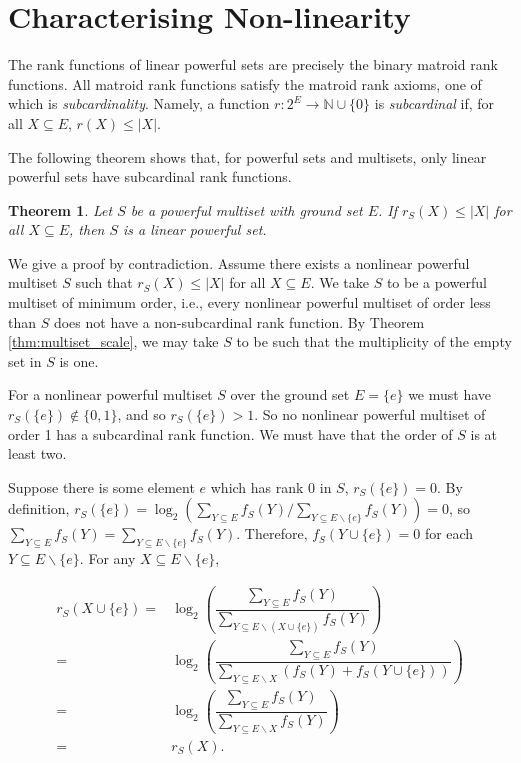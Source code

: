 \documentclass[10pt]{article}
\newtheorem{thm}{Theorem}[section]
\theoremstyle{definition}
\def\pf{\noindent {\it Proof.\ }}
\begin{document}
	
	\section{Characterising Non-linearity} 
	\label{sec:nonlinear}	
	The rank functions of linear powerful sets are precisely the binary matroid rank functions. All matroid rank functions satisfy the matroid rank axioms, one of which is \emph{subcardinality}. Namely, a function $r:2^E\to\mathbb{N}\cup\{0\}$ is \emph{subcardinal} if, for all $X\subseteq E$, $r(X)\leq |X|$. 
	
	The following theorem shows that, for powerful sets and multisets, only linear powerful sets have subcardinal rank functions.
	
	\begin{thm}\label{thm:linear}
		Let $S$ be a powerful multiset with ground set $E$. If $r_S(X)\leq |X|$ for all $X\subseteq E$, then $S$ is a linear powerful set.
	\end{thm}
	
	\pf
		We give a proof by contradiction. Assume there exists a nonlinear powerful multiset $S$ such that $r_S(X)\leq |X|$ for all $X\subseteq E$.  We take $S$ to be a powerful multiset of minimum order, i.e., every nonlinear powerful multiset of order less than $S$ does not have a non-subcardinal rank function.
		By Theorem \ref{thm:multiset_scale}, we may take $S$ to be such that the multiplicity of the empty set in $S$ is one.
	
	For a nonlinear powerful multiset $S$ over the ground set $E=\{e\}$ we must have $r_S(\{e\})\notin \{0,1\}$, and so $r_S(\{e\})> 1$. So no nonlinear powerful multiset of order 1 has a subcardinal rank function. We must have that the order of $S$ is at least two. 
		

	
	Suppose there is some element $e$ which has rank 0 in $S$, $r_S(\{e\})=0$. 	By definition, $r_S(\{e\})=\log_2(\sum_{Y\subseteq E}f_S(Y)/\sum_{Y\subseteq E\backslash\{e\}}f_S(Y))=0$, so $\sum_{Y\subseteq E}f_S(Y)=\sum_{Y\subseteq E\backslash\{e\}}f_S(Y)$. Therefore, $f_S(Y\cup\{e\})=0$ for each $Y\subseteq E\backslash{\{e\}}$. For any $X\subseteq E\backslash\{e\}$, 

\[	\begin{array}{rl}
	    r_S(X\cup\{e\})= &  \log_2\left( \dfrac{\sum_{Y\subseteq E}f_S(Y)}{\sum_{Y\subseteq E\backslash{(X\cup\{e\})}}f_S(Y)}\right) \\	 
	     = &  \log_2\left( \dfrac{\sum_{Y\subseteq E}f_S(Y)}{\sum_{Y\subseteq E\backslash{X}}\left(f_S(Y)+f_S(Y\cup\{e\})\right)}\right) \\
	     = &  \log_2\left( \dfrac{\sum_{Y\subseteq E}f_S(Y)}{\sum_{Y\subseteq E\backslash{X}}f_S(Y)}\right)\\
	     =&r_S(X).\\
	\end{array}\]
	
\end{document}
